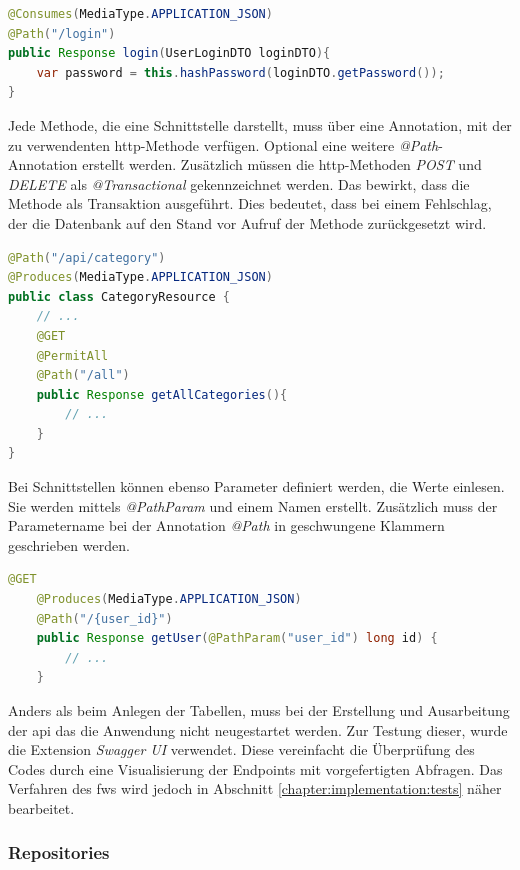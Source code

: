 \begin{lstlisting}[label=lst:consmes, language=Java, caption=@Consumes Ausschnitt von UserResource]
@Consumes(MediaType.APPLICATION_JSON)
@Path("/login")
public Response login(UserLoginDTO loginDTO){
    var password = this.hashPassword(loginDTO.getPassword());
}
\end{lstlisting}

Jede Methode, die eine Schnittstelle darstellt, muss über eine Annotation, mit der zu verwendenten \gls{http}-Methode verfügen. 
Optional eine weitere \emph{@Path}-Annotation erstellt werden. 
Zusätzlich müssen die \gls{http}-Methoden \emph{POST} und \emph{DELETE} als \emph{@Transactional} gekennzeichnet werden. 
Das bewirkt, dass die Methode als Transaktion ausgeführt. 
Dies bedeutet, dass bei einem Fehlschlag, der die Datenbank auf den Stand vor Aufruf der Methode zurückgesetzt wird.
\cite{TransactionAbout}

\begin{lstlisting}[label=lst:resourceClass, language=Java, caption=Anfang einer Resource Datei]
@Path("/api/category")
@Produces(MediaType.APPLICATION_JSON)
public class CategoryResource {
    // ...
    @GET
    @PermitAll
    @Path("/all")
    public Response getAllCategories(){
        // ...
    }
}
\end{lstlisting}

Bei Schnittstellen können ebenso Parameter definiert werden, die Werte einlesen. 
Sie werden mittels \emph{@PathParam} und einem Namen erstellt. 
Zusätzlich muss der Parametername bei der Annotation \emph{@Path} in geschwungene Klammern geschrieben werden. 

\begin{lstlisting}[label=lst:getUserEndpoint, language=Java, caption=Abfrage eines Users]
    @GET
    @Produces(MediaType.APPLICATION_JSON)
    @Path("/{user_id}")
    public Response getUser(@PathParam("user_id") long id) {
        // ...
    }
\end{lstlisting}

Anders als beim Anlegen der Tabellen, muss bei der Erstellung und Ausarbeitung der \gls{api} das die Anwendung nicht neugestartet werden. 
Zur Testung dieser, wurde die Extension \emph{Swagger UI} verwendet. 
Diese vereinfacht die Überprüfung des Codes durch eine Visualisierung der Endpoints mit vorgefertigten Abfragen. 
Das Verfahren des \gls{fw}s wird jedoch in Abschnitt \ref{chapter:implementation:tests} näher bearbeitet. 

\subsubsection{Repositories} 

